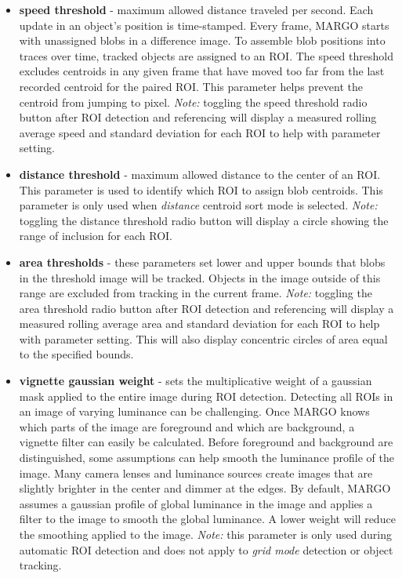 \documentclass[11pt]{article}
\begin{document}
\begin{itemize}
	\itemsep1em
	\item \textbf{speed threshold} - maximum allowed distance traveled per second. Each update in an object's position is time-stamped. Every frame, MARGO starts with unassigned blobs in a difference image. To assemble blob positions into traces over time, tracked objects are assigned to an ROI. The speed threshold excludes centroids in any given frame that have moved too far from the last recorded centroid for the paired ROI. This parameter helps prevent the centroid from jumping to pixel. \textit{Note:} toggling the speed threshold radio button after ROI detection and referencing will display a measured rolling average speed and standard deviation for each ROI to help with parameter setting.
	
	\item \textbf{distance threshold} - maximum allowed distance to the center of an ROI. This parameter is used to identify which ROI to assign blob centroids. This parameter is only used when \textit{distance} centroid sort mode is selected. \textit{Note:} toggling the distance threshold radio button will display a circle showing the range of inclusion for each ROI.
	
	\item \textbf{area thresholds} - these parameters set lower and upper bounds that blobs in the threshold image will be tracked. Objects in the image outside of this range are excluded from tracking in the current frame. \textit{Note:} toggling the area threshold radio button after ROI detection and referencing will display a measured rolling average area and standard deviation for each ROI to help with parameter setting. This will also display concentric circles of area equal to the specified bounds.
	
	\item \textbf{vignette gaussian weight} - sets the multiplicative weight of a gaussian mask applied to the entire image during ROI detection. Detecting all ROIs in an image of varying luminance can be challenging. Once MARGO knows which parts of the image are foreground and which are background, a vignette filter can easily be calculated. Before foreground and background are distinguished, some assumptions can help smooth the luminance profile of the image. Many camera lenses and luminance sources create images that are slightly brighter in the center and dimmer at the edges. By default, MARGO assumes a gaussian profile of global luminance in the image and applies a filter to the image to smooth the global luminance. A lower weight will reduce the smoothing applied to the image. \textit{Note:} this parameter is only used during automatic ROI detection and does not apply to \textit{grid mode} detection or object tracking.
	

\end{itemize}
\end{document}
